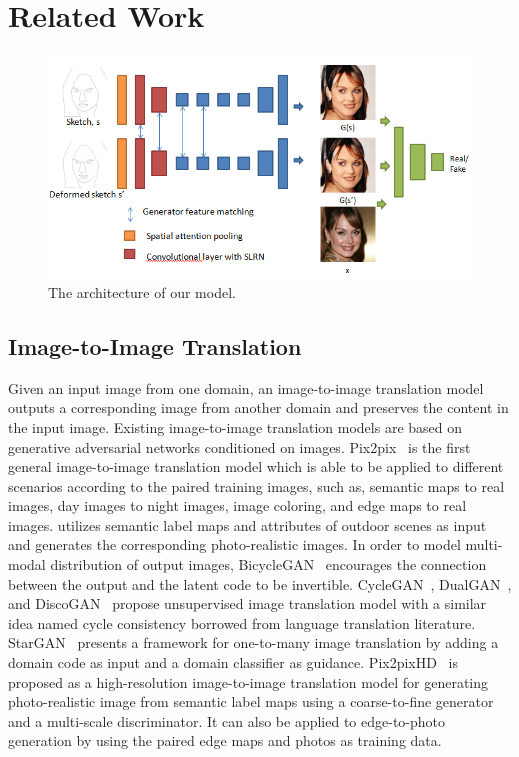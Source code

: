 \section{Related Work}
% 
\begin{figure}
	\includegraphics[width=\textwidth]{figs/architecture.png}
	\caption{The architecture of our model.}
	\label{fig:architecture}
\end{figure}
%
\subsection{Image-to-Image Translation}
Given an input image from one domain, an image-to-image translation model outputs a corresponding image from another domain and preserves the content in the input image. Existing image-to-image translation models are based on generative adversarial networks conditioned on images. 
%
Pix2pix~\cite{pix2pix} is the first general image-to-image translation model which is able to be applied to different scenarios according to the paired training images, such as, semantic maps to real images, day images to night images, image coloring, and edge maps to real images. 
%
\cite{outdoor_scene} utilizes semantic label maps and attributes of outdoor scenes as input and generates the corresponding photo-realistic images.
%
In order to model multi-modal distribution of output images, BicycleGAN~\cite{BicycleGAN} encourages the connection between the output and the latent code to be invertible.
%
CycleGAN~\cite{CycleGAN}, DualGAN~\cite{DualGAN}, and DiscoGAN~\cite{DiscoGAN} propose unsupervised image translation model with a similar idea named cycle consistency borrowed from language translation literature. 
%
StarGAN~\cite{StarGAN} presents a framework for one-to-many image translation by adding a domain code as input and a domain classifier as guidance.
%
Pix2pixHD~\cite{pix2pixHD} is proposed as a high-resolution image-to-image translation model for generating photo-realistic image from semantic label maps using a coarse-to-fine generator and a multi-scale discriminator. It can also be applied to edge-to-photo generation by using the paired edge maps and photos as training data.
%

